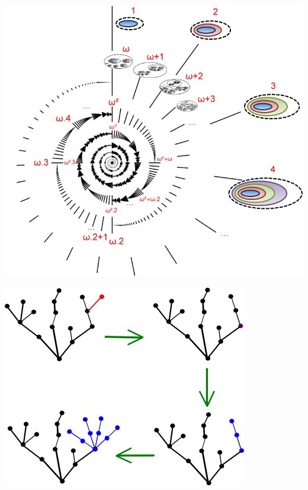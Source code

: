 \documentclass{uebblatt}
\begin{document}
\begin{center}
  \begin{minipage}{0.55\textwidth}
    \href{http://naturelovesmath-en.blogspot.de/2012/07/infinity-and-transfinite-numbers.html}{
      \includegraphics[scale=0.4]{images/ordinal-numbers}
    }
  \end{minipage}
  \qquad
  \begin{minipage}{0.30\textwidth}
    \href{http://markhkim.com/2013/10/killing-the-hydra/}{
      \includegraphics[scale=0.5]{images/hydra}
    }
  \end{minipage}
\end{center}
\end{document}
